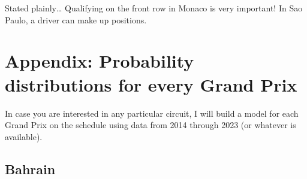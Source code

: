 \documentclass[
]{book}
\begin{document}
Stated plainly\ldots{} Qualifying on the front row in Monaco is very important! In Sao Paulo, a driver can make up positions.

\hypertarget{appendix-probability-distributions-for-every-grand-prix}{%
\section{Appendix: Probability distributions for every Grand Prix}\label{appendix-probability-distributions-for-every-grand-prix}}

In case you are interested in any particular circuit, I will build a model for each Grand Prix on the schedule using data from 2014 through 2023 (or whatever is available).

\hypertarget{bahrain-1}{%
\subsection{Bahrain}\label{bahrain-1}}
\end{document}
